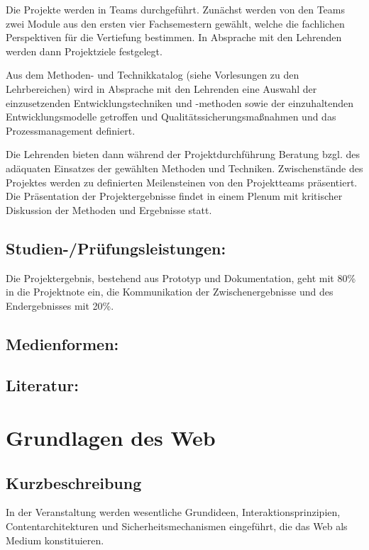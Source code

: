 Die Projekte werden in Teams durchgeführt. Zunächst werden von den Teams
zwei Module aus den ersten vier Fachsemestern gewählt, welche die
fachlichen Perspektiven für die Vertiefung bestimmen. In Absprache mit
den Lehrenden werden dann Projektziele festgelegt.

Aus dem Methoden- und Technikkatalog (siehe Vorlesungen zu den
Lehrbereichen) wird in Absprache mit den Lehrenden eine Auswahl der
einzusetzenden Entwicklungstechniken und -methoden sowie der
einzuhaltenden Entwicklungsmodelle getroffen und
Qualitätssicherungsmaßnahmen und das Prozessmanagement definiert.

Die Lehrenden bieten dann während der Projektdurchführung Beratung bzgl.
des adäquaten Einsatzes der gewählten Methoden und Techniken.
Zwischenstände des Projektes werden zu definierten Meilensteinen von den
Projektteams präsentiert. Die Präsentation der Projektergebnisse findet
in einem Plenum mit kritischer Diskussion der Methoden und Ergebnisse
statt.

\section{Studien-/Prüfungsleistungen:}\label{studien-pruxfcfungsleistungen-10}

Die Projektergebnis, bestehend aus Prototyp und Dokumentation, geht mit
80\% in die Projektnote ein, die Kommunikation der Zwischenergebnisse
und des Endergebnisses mit 20\%.

\section{Medienformen:}\label{medienformen-10}

\section{Literatur:}\label{literatur-10}

\chapter{Grundlagen des Web}\label{grundlagen-des-web}

\section{Kurzbeschreibung}\label{kurzbeschreibung-2}

In der Veranstaltung werden wesentliche Grundideen,
Interaktionsprinzipien, Contentarchitekturen und Sicherheitsmechanismen
eingeführt, die das Web als Medium konstituieren.

